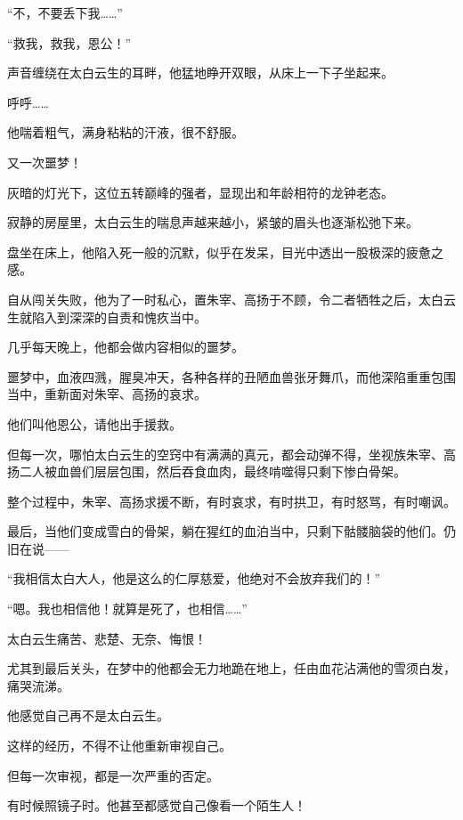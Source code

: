 
\begin{this_body}



“不，不要丢下我……”

“救我，救我，恩公！”

声音缠绕在太白云生的耳畔，他猛地睁开双眼，从床上一下子坐起来。

呼呼……

他喘着粗气，满身粘粘的汗液，很不舒服。

又一次噩梦！

灰暗的灯光下，这位五转巅峰的强者，显现出和年龄相符的龙钟老态。

寂静的房屋里，太白云生的喘息声越来越小，紧皱的眉头也逐渐松弛下来。

盘坐在床上，他陷入死一般的沉默，似乎在发呆，目光中透出一股极深的疲惫之感。

自从闯关失败，他为了一时私心，置朱宰、高扬于不顾，令二者牺牲之后，太白云生就陷入到深深的自责和愧疚当中。

几乎每天晚上，他都会做内容相似的噩梦。

噩梦中，血液四溅，腥臭冲天，各种各样的丑陋血兽张牙舞爪，而他深陷重重包围当中，重新面对朱宰、高扬的哀求。

他们叫他恩公，请他出手援救。

但每一次，哪怕太白云生的空窍中有满满的真元，都会动弹不得，坐视族朱宰、高扬二人被血兽们层层包围，然后吞食血肉，最终啃噬得只剩下惨白骨架。

整个过程中，朱宰、高扬求援不断，有时哀求，有时拱卫，有时怒骂，有时嘲讽。

最后，当他们变成雪白的骨架，躺在猩红的血泊当中，只剩下骷髅脑袋的他们。仍旧在说——

“我相信太白大人，他是这么的仁厚慈爱，他绝对不会放弃我们的！”

“嗯。我也相信他！就算是死了，也相信……”

太白云生痛苦、悲楚、无奈、悔恨！

尤其到最后关头，在梦中的他都会无力地跪在地上，任由血花沾满他的雪须白发，痛哭流涕。

他感觉自己再不是太白云生。

这样的经历，不得不让他重新审视自己。

但每一次审视，都是一次严重的否定。

有时候照镜子时。他甚至都感觉自己像看一个陌生人！


\end{this_body}
